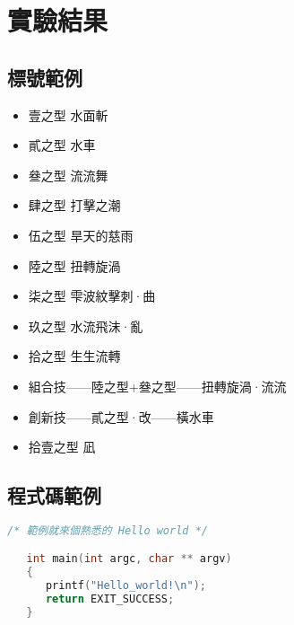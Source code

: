 \chapter{實驗結果}\label{result}

\section{標號範例}
\begin{itemize}
\item 壹之型 水面斬
\item 貳之型 水車
\item 叄之型 流流舞
\item 肆之型 打擊之潮
\item 伍之型 旱天的慈雨
\item 陸之型 扭轉旋渦
\item 柒之型 雫波紋擊刺·曲
\item 玖之型 水流飛沫·亂
\item 拾之型 生生流轉
\item 組合技——陸之型+叄之型——扭轉旋渦·流流
\item 創新技——貳之型·改——橫水車
\item 拾壹之型 凪
\end{itemize}

\clearpage

\section{程式碼範例}

\begin{lstlisting}[language=C]
   /* 範例就來個熟悉的 Hello world */

   int main(int argc, char ** argv) 
   { 
      printf("Hello_world!\n");
      return EXIT_SUCCESS; 
   }
\end{lstlisting}

\clearpage


